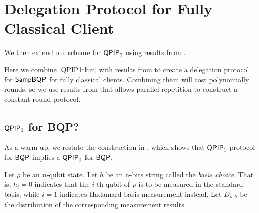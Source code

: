 \section{Delegation Protocol for Fully Classical Client}


We then extend our scheme for $\operatorname{\mathsf{QPIP}}_0$ using results from \cite{mahadev_delegation}.

Here we combine \autoref{QPIP1thm} with results from \cite{mahadev_delegation} to create a delegation protocol for $\operatorname{\mathsf{SampBQP}}$ for fully classical clients. Combining them will cost polynomially rounds, so we use results from \cite{parallelrep} that allows parallel repetition to construct a constant-round protocol.


\subsection{$\operatorname{\mathsf{QPIP}}_0$ for BQP?}
As a warm-up, we  restate the construction in \cite{mahadev_delegation}, which shows that $\operatorname{\mathsf{QPIP}}_1$ protocol for $\operatorname{\mathsf{BQP}}$ implies a $\operatorname{\mathsf{QPIP}}_0$ for $\operatorname{\mathsf{BQP}}$.

Let $\rho$ be an $n$-qubit state. Let $h$ be an n-bits string called the \emph{basis choice}. That is, $h_i=0$ indicates that the $i$-th qubit of $\rho$ is to be measured in the standard basis, while $i=1$ indicates Hadamard basis measurement instead. Let $D_{\rho, h}$ be the distribution of the corresponding measurement results.





